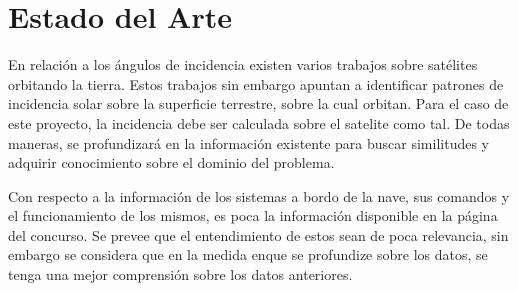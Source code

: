 \documentclass[../Main.tex]{subfiles}
\begin{document}
\section{Estado del Arte}
En relación a los ángulos de incidencia existen varios trabajos sobre satélites orbitando la tierra. Estos trabajos sin embargo apuntan a identificar patrones de incidencia solar sobre la superficie terrestre, sobre la cual orbitan. Para el caso de este proyecto, la incidencia debe ser calculada sobre el satelite como tal. De todas maneras, se profundizará en la información existente para buscar similitudes y adquirir conocimiento sobre el dominio del problema.
\newline \par
Con respecto a la información de los sistemas a bordo de la nave, sus comandos y el funcionamiento de los mismos, es poca la información disponible en la página del concurso. Se prevee que el entendimiento de estos sean de poca relevancia, sin embargo se considera que en la medida enque se profundize sobre los datos, se tenga una mejor comprensión sobre los datos anteriores. 
\end{document}
